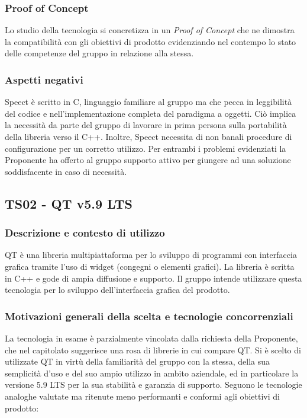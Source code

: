 \documentclass[./../Technology Baseline.tex]{subfiles}
\begin{document}
\subsubsection{Proof of Concept}
Lo studio della tecnologia si concretizza in un \textit{Proof of Concept} che ne dimostra la compatibilità con gli obiettivi di prodotto evidenziando nel contempo lo stato delle competenze del gruppo in relazione alla stessa.

\subsubsection{Aspetti negativi}
Speect è scritto in C, linguaggio familiare al gruppo ma che pecca in leggibilità del codice e nell'implementazione completa del paradigma a oggetti. Ciò implica la necessità da parte del gruppo di lavorare in prima persona sulla portabilità della libreria verso il C++. Inoltre, Speect necessita di non banali procedure di configurazione per un corretto utilizzo. Per entrambi i problemi evidenziati la Proponente ha offerto al gruppo supporto attivo per giungere ad una soluzione soddisfacente in caso di necessità. 

\subsection{TS02 - QT v5.9 LTS}

\subsubsection{Descrizione e contesto di utilizzo}

QT è una libreria multipiattaforma per lo sviluppo di programmi con interfaccia grafica tramite l'uso di widget (congegni o elementi grafici). La libreria è scritta in C++ e gode di ampia diffusione e supporto. Il gruppo intende utilizzare questa tecnologia per lo sviluppo dell'interfaccia grafica del prodotto.  

\subsubsection{Motivazioni generali della scelta e tecnologie concorrenziali}
La tecnologia in esame è parzialmente vincolata dalla richiesta della Proponente, che nel capitolato suggerisce una rosa di librerie in cui compare QT. Si è scelto di utilizzate QT in virtù della familiarità del gruppo con la stessa, della sua semplicità d'uso e del suo ampio utilizzo in ambito aziendale, ed in particolare la versione 5.9 LTS per la sua stabilità e garanzia di supporto. Seguono le tecnologie analoghe valutate ma ritenute meno performanti e conformi agli obiettivi di prodotto:
\end{document}
